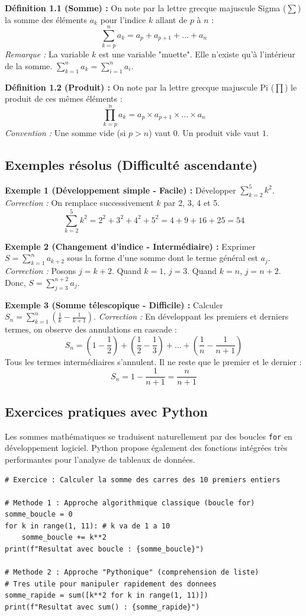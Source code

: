 \textbf{Définition 1.1 (Somme) :} On note par la lettre grecque majuscule Sigma ($\sum$) la somme des éléments $a_k$ pour l'indice $k$ allant de $p$ à $n$ :
\[ \sum_{k=p}^{n} a_k = a_p + a_{p+1} + \dots + a_n \]
\textit{Remarque :} La variable $k$ est une variable "muette". Elle n'existe qu'à l'intérieur de la somme. $\sum_{k=1}^n a_k = \sum_{i=1}^n a_i$.

\textbf{Définition 1.2 (Produit) :} On note par la lettre grecque majuscule Pi ($\prod$) le produit de ces mêmes éléments :
\[ \prod_{k=p}^{n} a_k = a_p \times a_{p+1} \times \dots \times a_n \]
\textit{Convention :} Une somme vide (si $p > n$) vaut $0$. Un produit vide vaut $1$.

\subsection{Exemples résolus (Difficulté ascendante)}

\textbf{Exemple 1 (Développement simple - Facile) :} 
Développer $\sum_{k=2}^{5} k^2$.
\textit{Correction :} On remplace successivement $k$ par 2, 3, 4 et 5.
\[ \sum_{k=2}^{5} k^2 = 2^2 + 3^2 + 4^2 + 5^2 = 4 + 9 + 16 + 25 = 54 \]

\textbf{Exemple 2 (Changement d'indice - Intermédiaire) :}
Exprimer $S = \sum_{k=1}^{n} a_{k+2}$ sous la forme d'une somme dont le terme général est $a_j$.
\textit{Correction :} Posons $j = k+2$. 
Quand $k=1$, $j=3$. Quand $k=n$, $j=n+2$.
Donc, $S = \sum_{j=3}^{n+2} a_j$.

\textbf{Exemple 3 (Somme télescopique - Difficile) :}
Calculer $S_n = \sum_{k=1}^{n} \left( \frac{1}{k} - \frac{1}{k+1} \right)$.
\textit{Correction :} En développant les premiers et derniers termes, on observe des annulations en cascade :
\[ S_n = \left(1 - \frac{1}{2}\right) + \left(\frac{1}{2} - \frac{1}{3}\right) + \dots + \left(\frac{1}{n} - \frac{1}{n+1}\right) \]
Tous les termes intermédiaires s'annulent. Il ne reste que le premier et le dernier :
\[ S_n = 1 - \frac{1}{n+1} = \frac{n}{n+1} \]

\subsection{Exercices pratiques avec Python}
Les sommes mathématiques se traduisent naturellement par des boucles \texttt{for} en développement logiciel. Python propose également des fonctions intégrées très performantes pour l'analyse de tableaux de données.

\begin{lstlisting}
# Exercice : Calculer la somme des carres des 10 premiers entiers

# Methode 1 : Approche algorithmique classique (boucle for)
somme_boucle = 0
for k in range(1, 11): # k va de 1 a 10
    somme_boucle += k**2
print(f"Resultat avec boucle : {somme_boucle}")

# Methode 2 : Approche "Pythonique" (comprehension de liste)
# Tres utile pour manipuler rapidement des donnees
somme_rapide = sum([k**2 for k in range(1, 11)])
print(f"Resultat avec sum() : {somme_rapide}")
\end{lstlisting}

